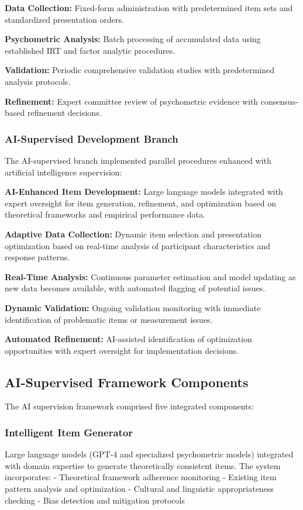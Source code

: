 \documentclass[12pt,a4paper]{article}
\begin{document}
\textbf{Data Collection:} Fixed-form administration with predetermined item sets and standardized presentation orders.

\textbf{Psychometric Analysis:} Batch processing of accumulated data using established IRT and factor analytic procedures.

\textbf{Validation:} Periodic comprehensive validation studies with predetermined analysis protocols.

\textbf{Refinement:} Expert committee review of psychometric evidence with consensus-based refinement decisions.

\subsubsection{AI-Supervised Development Branch}

The AI-supervised branch implemented parallel procedures enhanced with artificial intelligence supervision:

\textbf{AI-Enhanced Item Development:} Large language models integrated with expert oversight for item generation, refinement, and optimization based on theoretical frameworks and empirical performance data.

\textbf{Adaptive Data Collection:} Dynamic item selection and presentation optimization based on real-time analysis of participant characteristics and response patterns.

\textbf{Real-Time Analysis:} Continuous parameter estimation and model updating as new data becomes available, with automated flagging of potential issues.

\textbf{Dynamic Validation:} Ongoing validation monitoring with immediate identification of problematic items or measurement issues.

\textbf{Automated Refinement:} AI-assisted identification of optimization opportunities with expert oversight for implementation decisions.

\subsection{AI-Supervised Framework Components}

The AI supervision framework comprised five integrated components:

\subsubsection{Intelligent Item Generator}
Large language models (GPT-4 and specialized psychometric models) integrated with domain expertise to generate theoretically consistent items. The system incorporates:
- Theoretical framework adherence monitoring
- Existing item pattern analysis and optimization
- Cultural and linguistic appropriateness checking
- Bias detection and mitigation protocols
\end{document}
